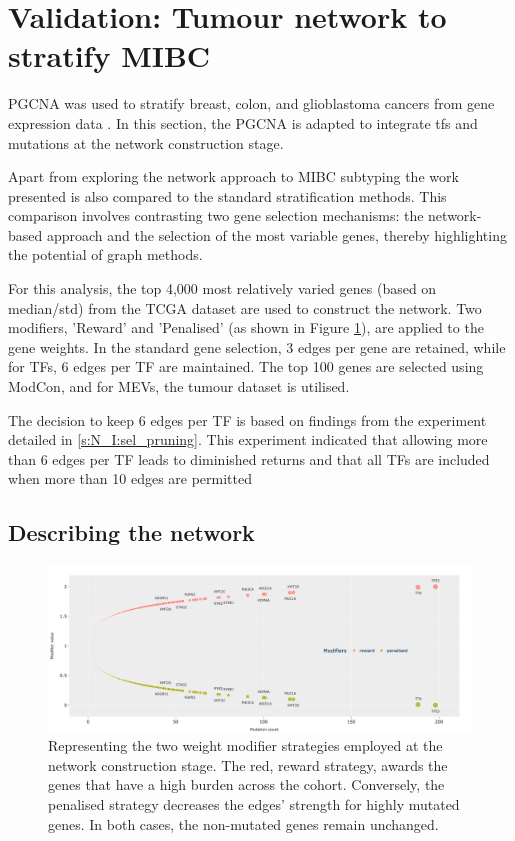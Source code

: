 


\section{Validation: Tumour network to stratify MIBC} \label{s:N_I:tum}


\acrlong{PGCNA} was used to stratify breast, colon, and glioblastoma cancers  from gene expression data \citet{Care2019-ij,Tanner2023-wa}. In this section, the PGCNA is adapted to integrate \acrfull{tfs} and mutations at the network construction stage. 

Apart from exploring the network approach to MIBC subtyping the work presented is also compared to the standard stratification methods. This comparison involves contrasting two gene selection mechanisms: the network-based approach and the selection of the most variable genes, thereby highlighting the potential of graph methods.

For this analysis, the top 4,000 most relatively varied genes (based on median/std) from the TCGA dataset are used to construct the network. Two modifiers, 'Reward' and 'Penalised' (as shown in Figure \ref{fig:N_I:modifiers}), are applied to the gene weights. In the standard gene selection, 3 edges per gene are retained, while for TFs, 6 edges per TF are maintained. The top 100 genes are selected using ModCon, and for MEVs, the tumour dataset is utilised.

The decision to keep 6 edges per TF is based on findings from the experiment detailed in \cref{s:N_I:sel_pruning}. This experiment indicated that allowing more than 6 edges per TF leads to diminished returns and that all TFs are included when more than 10 edges are permitted

\subsection{Describing the network} \label{s:N_I:tum_describe}

\begin{figure}[!htb]    \centering\includegraphics[width=1.0\textwidth,keepaspectratio]{Sections/Network_I/Resources/Methods/modifiers.png}
    \caption{Representing the two weight modifier strategies employed at the network construction stage. The red, reward strategy, awards the genes that have a high burden across the cohort. Conversely, the  penalised strategy decreases the edges' strength for highly mutated genes. In both cases, the non-mutated genes remain unchanged.}
    \label{fig:N_I:modifiers}
\end{figure}

